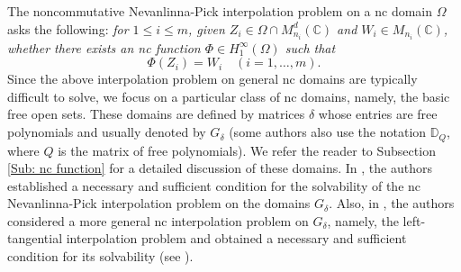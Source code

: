 \documentclass[12pt]{amsart}%
\numberwithin{equation}{section}
\newcommand{\D}{\mathbb{D}}
\newcommand{\C}{\mathbb{C}}
\begin{document}
The noncommutative Nevanlinna-Pick interpolation problem on a nc domain $\Omega$ asks the following: \textit{for $1\leq i\leq m$, given $Z_i\in \Omega\cap M^d_{n_i}(\C)$ and $W_i\in M_{n_i}(\C)$, whether there exists an nc function $\Phi\in H_1^{\infty}(\Omega)$ such that 
\[
\Phi(Z_i)=W_i\quad (i=1,\ldots,m).
\]}
Since the above interpolation problem on general nc domains are typically difficult to solve, we focus on a particular class of nc domains, namely, the basic free open sets. These domains are defined by matrices $\delta$ whose entries are free polynomials and usually denoted by $G_{\delta}$ (some authors also use the notation $\D_{Q}$, where $Q$ is the matrix of free polynomials). We refer the reader to Subsection \ref{Sub: nc function} for a detailed discussion of these domains. In \cite[Theorem 1.3]{AM15}, the authors established a necessary and sufficient condition for the solvability of the nc Nevanlinna-Pick interpolation problem on the domains $G_{\delta}$. Also, in \cite{BMV18}, the authors considered a more general nc interpolation problem on $G_\delta$, namely, the left-tangential interpolation problem and obtained a necessary and sufficient condition for its solvability (see \cite[Theorem 3.1]{BMV18}). 
\end{document}
